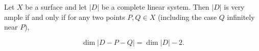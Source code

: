 Let $X$ be a surface and let $|D|$ be a complete linear system. Then $|D|$ is very ample if and only if for any two points $P, Q \in X$ (including the case $Q$ infinitely near $P$),

$$\dim |D - P - Q| = \dim |D| - 2.$$
